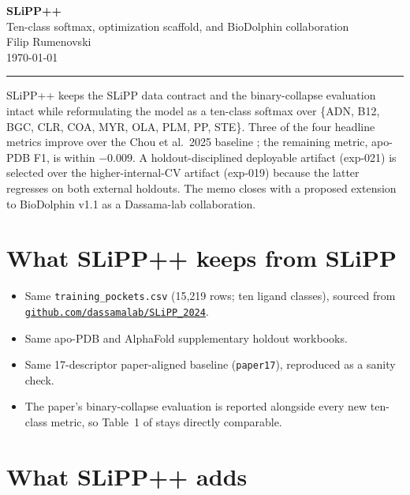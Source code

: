 \documentclass[11pt]{article}
\begin{document}
\begin{center}
{\LARGE\bfseries SLiPP++}\\[0.4em]
{\large Ten-class softmax, optimization scaffold, and BioDolphin collaboration}\\[1.1em]
{\large Filip Rumenovski}\\[0.45em]
{\normalsize \today}
\end{center}

\vspace{1em}
\noindent\rule{\textwidth}{0.4pt}
\vspace{0.85em}

SLiPP++ keeps the SLiPP data contract and the binary-collapse evaluation intact while reformulating the model as a ten-class softmax over \{ADN, B12, BGC, CLR, COA, MYR, OLA, PLM, PP, STE\}. Three of the four headline metrics improve over the Chou et al.\ 2025 baseline \cite{chou2025}; the remaining metric, apo-PDB F1, is within $-0.009$. A holdout-disciplined deployable artifact (exp-021) is selected over the higher-internal-CV artifact (exp-019) because the latter regresses on both external holdouts. The memo closes with a proposed extension to BioDolphin v1.1 \cite{yang2024} as a Dassama-lab collaboration.

\section{What SLiPP++ keeps from SLiPP}

\begin{itemize}
\item Same \texttt{training\_pockets.csv} (15{,}219 rows; ten ligand classes), sourced from \href{https://github.com/dassamalab/SLiPP_2024}{\nolinkurl{github.com/dassamalab/SLiPP_2024}}.
\item Same apo-PDB and AlphaFold supplementary holdout workbooks.
\item Same 17-descriptor paper-aligned baseline (\texttt{paper17}), reproduced as a sanity check.
\item The paper's binary-collapse evaluation is reported alongside every new ten-class metric, so Table~1 of \cite{chou2025} stays directly comparable.
\end{itemize}

\section{What SLiPP++ adds}
\end{document}

